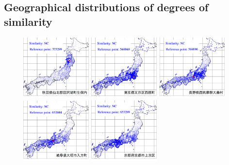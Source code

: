 \documentclass[output=paper]{LSP/langsci}
\begin{document}
\subsection{ Geographical distributions of degrees of similarity}


\begin{figure}[b]
\includegraphics[width=0.32\textwidth]{illustrations/kuma_fig20-1}
\includegraphics[width=0.32\textwidth]{illustrations/kuma_fig20-2}
\includegraphics[width=0.32\textwidth]{illustrations/kuma_fig20-3}
\\
\includegraphics[width=0.32\textwidth]{illustrations/kuma_fig20-4}
\includegraphics[width=0.32\textwidth]{illustrations/kuma_fig20-5}

\end{figure}
\end{document}

